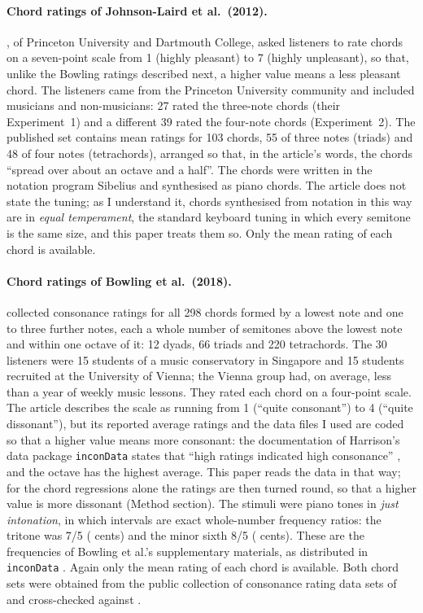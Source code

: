 \documentclass[11pt,a4paper]{article}
\begin{document}
\paragraph{Chord ratings of Johnson-Laird et al.\ (2012).}
\citet{johnsonlaird2012}, of Princeton University and Dartmouth College, asked listeners to rate chords on a
seven-point scale from 1 (highly pleasant) to 7 (highly unpleasant), so that, unlike the Bowling ratings described next, a higher value means a less pleasant chord. The listeners came from the Princeton University community and included musicians and non-musicians: 27 rated the three-note chords (their Experiment~1) and a different 39 rated the four-note chords (Experiment~2). The published set contains mean
ratings for 103 chords, 55 of three notes (triads) and 48 of four notes (tetrachords), arranged so that, in the article's words, the chords ``spread over about an octave and a
half''. The chords were written in the notation program Sibelius and synthesised as piano
chords. The article does not state the tuning; as I understand it, chords synthesised from
notation in this way are in \emph{equal temperament}, the standard keyboard tuning in which
every semitone is the same size, and this paper treats them so. Only the mean rating of each chord is available.

\paragraph{Chord ratings of Bowling et al.\ (2018).}
\citet{bowling2018} collected consonance ratings for all 298 chords formed by a lowest
note and one to three further notes, each a whole number of semitones above the lowest note and
within one octave of it: 12 dyads, 66 triads and 220 tetrachords.
The 30 listeners were 15 students of a music conservatory in Singapore and 15 students
recruited at the University of Vienna; the Vienna group had, on average, less than a year of
weekly music lessons. They rated each chord on a
four-point scale. The article describes the scale as running from 1 (``quite consonant'') to
4 (``quite dissonant''), but its reported average ratings and the data files I used are
coded so that a higher value means more consonant: the documentation of Harrison's data package \texttt{inconData}
states that ``high ratings indicated high consonance'' \citep{incondata}, and the octave has
the highest average. This paper reads the data in that way; for the chord regressions
alone the ratings are then turned round, so that a higher value is more dissonant (Method
section). The stimuli were piano
tones in \emph{just intonation}, in which intervals are exact whole-number frequency ratios:
the tritone was 7/5 (\jiCentsTT{} cents) and the minor sixth 8/5 (\jiCentsMsix{} cents).
These are the frequencies of Bowling et al.'s supplementary materials, as distributed in
\texttt{inconData} \citep{incondata}. Again only the mean rating of each chord is
available. Both chord sets were obtained from the public collection of consonance rating data sets of
\citet{dcmlab} and cross-checked against
\citet{incondata}.
\end{document}
